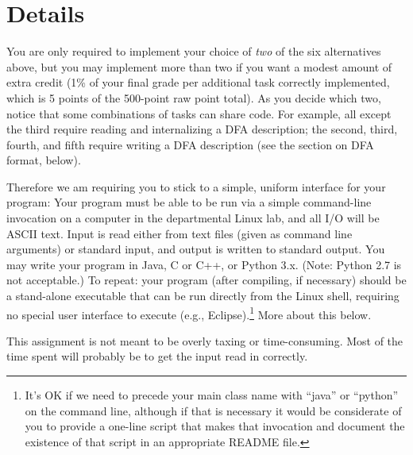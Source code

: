 \newpage
\section*{Details}

You are only required to implement your choice of \emph{two} of the
six alternatives above, but you may implement more than two if you
want a modest amount of extra credit (1\% of your final grade per
additional task correctly implemented, which is 5 points of the
500-point raw point total).
As you decide which two,
notice that some combinations of tasks can share code.
For example, all except the third require reading and internalizing a
DFA description; the second, third, fourth, and fifth require writing
a DFA description (see the section on DFA format, below).

Therefore we am requiring you to stick to a simple, uniform interface
for your program:
Your program must be able to be run via a simple command-line
invocation on a computer in the departmental Linux lab,
and all I/O will be ASCII text.
Input is read either from text files (given as command line arguments)
or standard input, and output is written to standard output.
You may write your program in Java, C or C++, or Python 3.x.
(Note: Python 2.7 is not acceptable.)
To repeat: your program (after compiling, if necessary) should be a
stand-alone executable that can be run directly from the Linux shell,
requiring no special user interface to execute
(e.g., Eclipse).\footnote{It's OK if we need to precede your main class
name with ``java'' or ``python'' on the command line, although if that is
necessary it would be considerate of you to provide a one-line script
that makes that invocation and document the existence of that script in
an appropriate README file.}
More about this below.

This assignment is not meant to be overly taxing or time-consuming.
Most of the time spent will probably be to get the input read in correctly.

